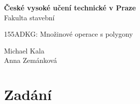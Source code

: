 \documentclass[a4paper, 12pt]{article}
\begin{document}
\begin{titlepage}
\begin{center}
\noindent
\Large \textbf{České vysoké učení technické v Praze }\\ Fakulta stavební
\vspace{5cm}

\huge


\vspace{0.5cm}

155ADKG: Množinové operace s polygony \\

\vspace{10cm}




\Large
Michael Kala\\
Anna Zemánková \\

\end{center}

\end{titlepage}




\pagestyle{plain}     %
\setcounter{page}{1}  %


\section{Zadání}
\end{document}
